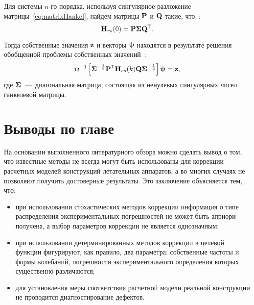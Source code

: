 Для системы $ n $-го порядка, используя сингулярное разложение матрицы~\eqref{eq:matrixHankel}, найдем матрицы $ \mathbf{P} $ и $ \mathbf{Q} $ такие, что~\cite{lib:oma:Caicedo}:
\begin{equation}
	\mathbf{H}_{rs}(0) = \mathbf{P} \mathbf{\Sigma} \mathbf{Q} ^ \mathsf{T}.
\end{equation}

Тогда собственные значения $ \mathbf{z} $ и векторы $ \mathbf{\uppsi} $ находятся в результате решения обобщенной проблемы собственных значений~\cite{lib:oma:Juang&Pappa}:
\begin{equation}
	\mathbf{\uppsi} ^ {-1} \left[ \mathbf{\Sigma} ^ {-\frac{1}{2}} \mathbf{P} ^ \mathsf{T} \mathbf{H}_{rs}(k) \mathbf{Q} \mathbf{\Sigma} ^ {-\frac{1}{2}} \right] \uppsi = \mathbf{z},
\end{equation}
где $ \mathbf{\Sigma} $~---~диагональная матрица, состоящая из ненулевых сингулярных чисел ганкелевой матрицы.

\section{Выводы по главе \thechapter}

На основании выполненного литературного обзора можно сделать вывод о том, что известные методы не всегда могут быть использованы для коррекции расчетных моделей конструкций летательных аппаратов, а во многих случаях не позволяют получить достоверные результаты. Это заключение объясняется тем, что:
\begin{itemize}
	\item при использовании стохастических методов коррекции информация о типе распределения экспериментальных погрешностей не может быть априори получена, а выбор параметров коррекции не является однозначным;
	\item при использовании детерминированных методов коррекции в целевой функции фигурируют, как правило, два параметра: собственные частоты и формы колебаний, погрешности экспериментального определения которых существенно различаются;
	\item для установления меры соответствия расчетной модели реальной конструкции не проводится диагностирование дефектов. 
\end{itemize}